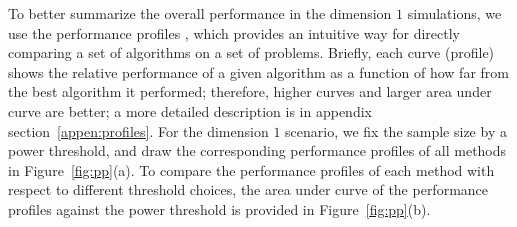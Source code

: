 \documentclass[11pt]{article}
\begin{document}
To better summarize the overall performance in the dimension $1$ simulations, we use the performance profiles \cite{DolanMore2002}, which provides an intuitive way for directly comparing a set of algorithms on a set of problems.  Briefly, each curve (profile) shows the relative performance of a given algorithm as a function of how far from the best algorithm it performed; therefore, higher curves and larger area under curve are better; a more detailed description is in appendix section~\ref{appen:profiles}. For the dimension $1$ scenario, we fix the sample size by a power threshold, and draw the corresponding performance profiles of all methods in Figure~\ref{fig:pp}(a). To compare the performance profiles of each method with respect to different threshold choices, the area under curve of the performance profiles against the power threshold is provided in Figure~\ref{fig:pp}(b).
\end{document}
